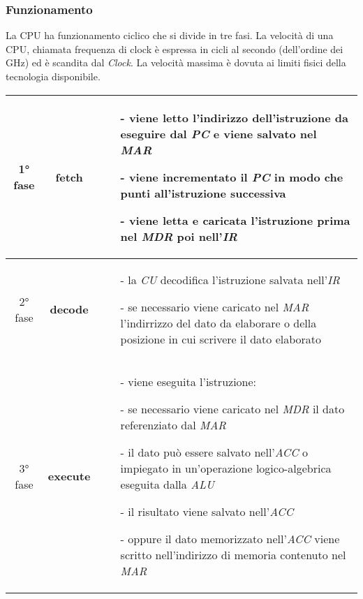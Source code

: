 \documentclass{article}
\begin{document}
\newpage

\subsubsection*{Funzionamento}
La CPU ha funzionamento ciclico che si divide in tre fasi. La velocità di una CPU, chiamata frequenza di clock è espressa
in cicli al secondo (dell'ordine dei GHz) ed è scandita dal \textit{Clock}. La velocità massima è dovuta ai limiti fisici
della tecnologia disponibile.

\begin{center}
	\begin{tabularx}{\textwidth}{c c X}
		\toprule
		1° fase & \textbf{fetch} &
		\begin{itemize}[topsep=3pt, itemsep=0pt, leftmargin=5pt]
			\item[-] viene letto l'indirizzo dell'istruzione da eseguire dal \textit{PC} e viene salvato nel \textit{MAR}
			\item[-] viene incrementato il \textit{PC} in modo che punti all'istruzione successiva
			\item[-] viene letta e caricata l'istruzione prima nel \textit{MDR} poi nell'\textit{IR}
		\end{itemize} \\
		\midrule
		2° fase & \textbf{decode} &
		\begin{itemize}[topsep=3pt, itemsep=0pt, leftmargin=5pt]
			\item[-] la \textit{CU} decodifica l'istruzione salvata nell'\textit{IR}
			\item[-] se necessario viene caricato nel \textit{MAR} l'indirrizzo del dato da elaborare o della posizione in cui scrivere il dato elaborato 
		\end{itemize} \\
		\midrule
		3° fase & \textbf{execute} &
		\begin{itemize}[topsep=3pt, itemsep=0pt, leftmargin=5pt]
			\item[-] viene eseguita l'istruzione:
			\item[-] se necessario viene caricato nel \textit{MDR} il dato referenziato dal \textit{MAR}
			\item[-] il dato può essere salvato nell'\textit{ACC} o impiegato in un'operazione logico-algebrica eseguita dalla \textit{ALU} 
			\item[-] il risultato viene salvato nell'\textit{ACC}
			\item[-] oppure il dato memorizzato nell'\textit{ACC} viene scritto nell'indirizzo di memoria contenuto nel \textit{MAR}
		\end{itemize} \\
		\bottomrule
	\end{tabularx}
\end{center}
\end{document}
